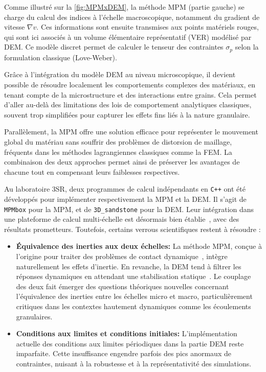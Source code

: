 \documentclass[a4paper,12pt]{report}
\begin{document}
Comme illustré sur la \autoref{fig:MPMxDEM}, la méthode MPM (partie gauche) se charge du calcul des indices à l’échelle macroscopique, notamment du gradient de vitesse $\nabla v$. Ces informations sont ensuite transmises aux points matériels rouges, qui sont ici associés à un volume élémentaire représentatif (VER) modélisé par DEM. Ce modèle discret permet de calculer le tenseur des contraintes $\sigma_p$ selon la formulation classique (Love-Weber).

Grâce à l’intégration du modèle DEM au niveau microscopique, il devient possible de résoudre localement les comportements complexes des matériaux, en tenant compte de la microstructure et des interactions entre grains. Cela permet d’aller au-delà des limitations des lois de comportement analytiques classiques, souvent trop simplifiées pour capturer les effets fins liés à la nature granulaire.

Parallèlement, la MPM offre une solution efficace pour représenter le mouvement global du matériau sans souffrir des problèmes de distorsion de maillage, fréquents dans les méthodes lagrangiennes classiques comme la FEM. La combinaison des deux approches permet ainsi de préserver les avantages de chacune tout en compensant leurs faiblesses respectives.

Au laboratoire 3SR, deux programmes de calcul indépendants en \texttt{C++} ont été développés pour implémenter respectivement la MPM et la DEM. Il s'agit de \texttt{MPMbox} pour la MPM, et de \texttt{3D\_sandstone} pour la DEM. Leur intégration dans une plateforme de calcul multi-échelle est désormais bien établie~\citep{richefeu2025mpmxdem}, avec des résultats prometteurs. Toutefois, certains verrous scientifiques restent à résoudre :

\begin{itemize}
    \item \textbf{Équivalence des inerties aux deux échelles:}  
    La méthode MPM, conçue à l’origine pour traiter des problèmes de contact dynamique~\citep{nguyen2023material}, intègre naturellement les effets d’inertie. En revanche, la DEM tend à filtrer les réponses dynamiques en attendant une stabilisation statique~\citep{nguyen2014fem}. Le couplage des deux fait émerger des questions théoriques nouvelles concernant l’équivalence des inerties entre les échelles micro et macro, particulièrement critiques dans les contextes hautement dynamiques comme les écoulements granulaires.

    \item \textbf{Conditions aux limites et conditions initiales:}  
    L’implémentation actuelle des conditions aux limites périodiques dans la partie DEM reste imparfaite. Cette insuffisance engendre parfois des pics anormaux de contraintes, nuisant à la robustesse et à la représentativité des simulations.
\end{itemize}
\end{document}

